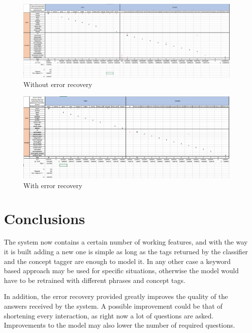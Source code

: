 \documentclass[11pt,a4paper]{article}
\begin{document}
\begin{figure}[h]
\centering
  \includegraphics[width=.9\linewidth]{Images/noerrrec}
  \caption{Without error recovery}
\label{fig:zipf}
\end{figure}

\begin{figure}[h]
\centering
  \includegraphics[width=.9\linewidth]{Images/errrec}
  \caption{With error recovery}
\label{fig:zipf}
\end{figure}

\section{Conclusions}
The system now contains a certain number of working features, and with the way it is built adding a new one is simple as long as the tags returned by the classifier and the concept tagger are enough to model it. In any other case a keyword based approach may be used for specific situations, otherwise the model would have to be retrained with different phrases and concept tags. 

In addition, the error recovery provided greatly improves the quality of the answers received by the system. A possible improvement could be that of shortening every interaction, as right now a lot of questions are asked. Improvements to the model may also lower the number of required questions.







%
%



\appendix
\end{document}
